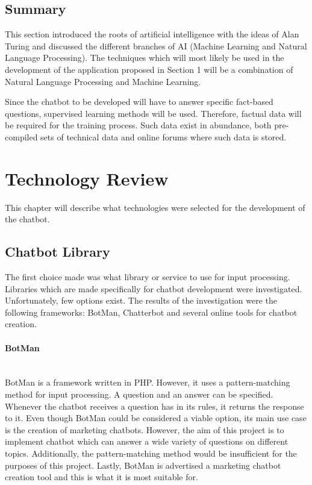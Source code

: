 \documentclass[12pt,a4paper]{article}
\newcommand{\myparagraph}[1]{\paragraph{#1}\mbox{}\\}
\begin{document}
%

\subsection{Summary}
This section introduced the roots of artificial intelligence with the ideas of Alan Turing and discussed the different branches of AI (Machine Learning and Natural Language Processing). The techniques which will most likely be used in the development of the application proposed in Section 1 will be a combination of Natural Language Processing and Machine Learning. 

Since the chatbot to be developed will have to answer specific fact-based questions, supervised learning methods will be used. Therefore, factual data will be required for the training process. Such data exist in abundance, both pre-compiled sets of technical data and online forums where such data is stored. 

\newpage
\section{Technology Review}
This chapter will describe what technologies were selected for the development of the chatbot.

\subsection{Chatbot Library}
The first choice made was what library or service to use for input processing. Libraries which are made specifically for chatbot development were investigated. Unfortunately, few options exist. The results of the investigation were the following frameworks: BotMan, Chatterbot and several online tools for chatbot creation.

\myparagraph{BotMan}
BotMan is a framework written in PHP. However, it uses a pattern-matching method for input processing. A question and an answer can be specified. Whenever the chatbot receives a question has in its rules, it returns the response to it. Even though BotMan could be considered a viable option, its main use case is the creation of marketing chatbots. However, the aim of this project is to implement chatbot which can answer a wide variety of questions on different topics. Additionally, the pattern-matching method would be insufficient for the purposes of this project. Lastly, BotMan is advertised a marketing chatbot creation tool and this is what it is most suitable for.
\end{document}

